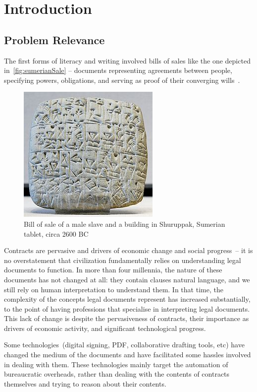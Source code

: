 \chapter{Introduction}\label{ch:introduction}

\section*{Problem Relevance}\label{sec:problem-relevance}

The first forms of literacy and writing involved bills of sales like the one depicted in~\autoref{fig:sumerianSale} -- documents representing agreements between people, specifying powers, obligations, and serving as proof of their converging wills~\cite{larsonContractLawIntro}.


\begin{figure}[h]
    \centering
    \includegraphics[width=0.5\columnwidth]{figures/sumerianSales}
    \caption{Bill of sale of a male slave and a building in Shuruppak, Sumerian tablet, circa 2600 BC}
    \label{fig:sumerianSale}
\end{figure}

Contracts are pervasive and drivers of economic change and social progress~-- it is no overstatement that civilization fundamentally relies on understanding legal documents to function.
In more than four millennia, the nature of these documents has not changed at all: they contain clauses natural language, and we still rely on human interpretation to understand them.
In that time, the complexity of the concepts legal documents represent has increased substantially, to the point of having professions that specialise in interpreting legal documents.
This lack of change is despite the pervasiveness of contracts, their importance as drivers of economic activity, and significant technological progress.

Some technologies~(digital signing, PDF, collaborative drafting tools, etc) have changed the medium of the documents and have facilitated some hassles involved in dealing with them.
These technologies mainly target the automation of bureaucratic overheads, rather than dealing with the contents of contracts themselves and trying to reason about their contents.

